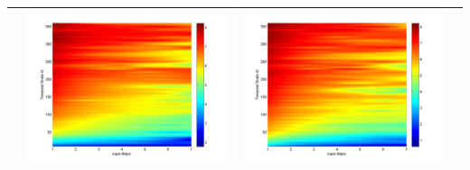 \documentclass[11pt]{article}
\begin{document}
\begin{table}[H]
{\begin{tabular}{cccc}
&\begin{minipage}{.3\textwidth}\includegraphics[width=\linewidth]{resultgraph/AU/06810000pep_abs.png}\end{minipage}
&\begin{minipage}{.3\textwidth}\includegraphics[width=\linewidth]{resultgraph/AU/06810000pepq_abs.png}\end{minipage}
\\
\bottomrule
\end{tabular}
}
\end{table}
\end{document}
